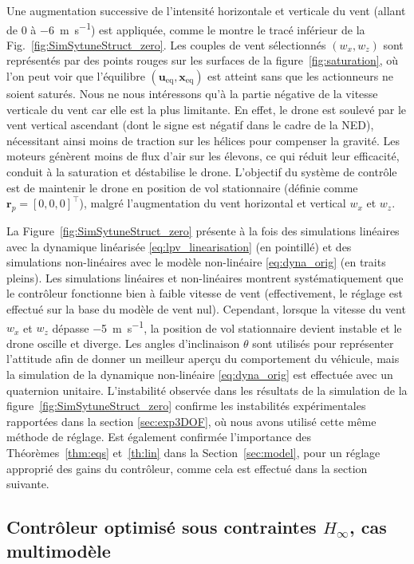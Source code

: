 Une augmentation successive de l'intensité horizontale et verticale du vent (allant de 0 à \SI{-6}{\meter\per\second}) est appliquée, comme le montre le tracé inférieur de la Fig.~\ref{fig:SimSytuneStruct_zero}. Les couples de vent sélectionnés $(w_{x}, w_{z})$ sont représentés par des points rouges sur les surfaces de la figure~\ref{fig:saturation}, où l'on peut voir que l'équilibre $(\boldsymbol{u}_{\text{eq}}, \boldsymbol{x}_{\text{eq}})$ est atteint sans que les actionneurs ne soient saturés. Nous ne nous intéressons qu'à la partie négative de la vitesse verticale du vent car elle est la plus limitante. En effet, le drone est soulevé par le vent vertical ascendant (dont le signe est négatif dans le cadre de la NED), nécessitant ainsi moins de traction sur les hélices pour compenser la gravité. Les moteurs génèrent moins de flux d'air sur les élevons, ce qui réduit leur efficacité, conduit à la saturation et déstabilise le drone.
L'objectif du système de contrôle est de maintenir le drone en position de vol stationnaire (définie comme $\boldsymbol{r}_{p} = [0,0,0]^\top$), malgré l'augmentation du vent horizontal et vertical $w_{x}$ et $w_{z}$. 


La Figure~\ref{fig:SimSytuneStruct_zero} présente à la fois des simulations linéaires avec la dynamique linéarisée \eqref{eq:lpv_linearisation} (en pointillé) et des simulations non-linéaires avec le modèle non-linéaire \eqref{eq:dyna_orig} (en traits pleins). Les simulations linéaires et non-linéaires montrent systématiquement que le contrôleur fonctionne bien à faible vitesse de vent (effectivement, le réglage est effectué sur la base du modèle de vent nul). Cependant, lorsque la vitesse du vent $w_{x}$ et $w_{z}$ dépasse \SI{-5}{\meter\per\second}, la position de vol stationnaire devient instable et le drone oscille et diverge. Les angles d'inclinaison $\theta$ sont utilisés pour représenter l'attitude afin de donner un meilleur aperçu du comportement du véhicule, mais la simulation de la dynamique non-linéaire \eqref{eq:dyna_orig} est effectuée avec un quaternion unitaire. L'instabilité observée dans les résultats de la simulation de la figure~\ref{fig:SimSytuneStruct_zero} confirme les instabilités expérimentales rapportées dans la section \ref{sec:exp3DOF}, où nous avons utilisé cette même méthode de réglage. Est également confirmée l'importance des Théorèmes~\ref{thm:eqs} et~\ref{th:lin} dans la Section~\ref{sec:model}, pour un réglage approprié des gains du contrôleur, comme cela est effectué dans la section suivante.


\subsection{Contrôleur optimisé sous contraintes $H_{\infty}$, cas multimodèle}
\label{sec:h_inf6DOF_multi}

